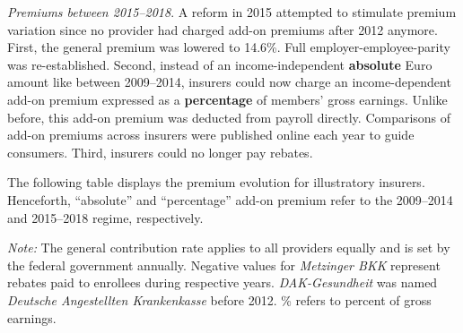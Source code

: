 \documentclass[a4paper, 11pt, english]{article}
\begin{document}
\textit{Premiums between 2015--2018}. A reform in 2015 attempted to stimulate premium variation since no provider had charged add-on premiums after 2012 anymore. First, the general premium was lowered to 14.6\%. Full employer-employee-parity was re-established. Second, instead of an income-independent \textbf{absolute} Euro amount like between 2009--2014, insurers could now charge an income-dependent add-on premium expressed as a \textbf{percentage} of members' gross earnings. Unlike before, this add-on premium was deducted from payroll directly. Comparisons of add-on premiums across insurers were published online each year to guide consumers. Third, insurers could no longer pay rebates.

The following table displays the premium evolution for illustratory insurers.  Henceforth, ``absolute'' and ``percentage'' add-on premium refer to the 2009--2014 and 2015--2018 regime, respectively.
\vspace{0.2em}
\begin{table}[H]\centering
	\caption*{Illustrative Evolution of Add-On Premiums between 2009--2018}
	\label{tab:add-on_illustration}
	\begin{minipage}{0.98\textwidth}
		\footnotesize \vspace{0.2em}
		\textit{Note:} The general contribution rate applies to all providers equally and is set by the federal government annually. Negative values for \textit{Metzinger BKK} represent rebates paid to enrollees during respective years. \textit{DAK-Gesundheit} was named \textit{Deutsche Angestellten Krankenkasse} before 2012. \% refers to percent of gross earnings. 
	\end{minipage}
\end{table}
\end{document}
